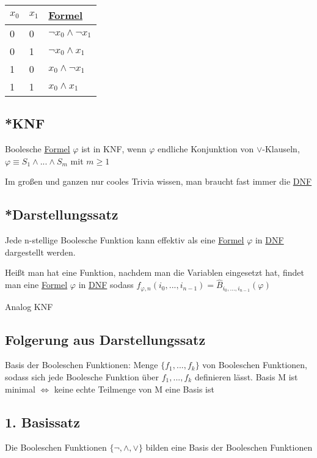 \documentclass[12pt,a4paper]{article} %
\begin{document}
	\begin{tabular}{l | l | l}
		$x_0$ & $x_1$ & \hyperref[Formel]{Formel} \\ \hline
		0 & 0 & $\neg x_0 \land \neg x_1$ \\
		0 & 1 & $\neg x_0 \land x_1$ \\
		1 & 0 & $x_0 \land \neg x_1$ \\
		1 & 1 & $x_0 \land x_1$ \\
	\end{tabular}
	
	\subsection{*KNF}
	Boolesche \hyperref[Formel]{Formel} $\varphi$ ist in KNF, wenn $\varphi$ endliche Konjunktion von $\lor$-Klauseln, $\varphi \equiv S_1 \land ... \land S_m$ mit $m \ge 1$
	
	Im großen und ganzen nur cooles Trivia wissen, man braucht fast immer die \hyperref[DNF]{DNF}
	
	\subsection{*Darstellungssatz}
	Jede n-stellige Boolesche Funktion kann effektiv als eine \hyperref[Formel]{Formel} $\varphi$ in \hyperref[DNF]{DNF} dargestellt werden. 
	
	Heißt man hat eine Funktion, nachdem man die Variablen eingesetzt hat, findet man eine \hyperref[Formel]{Formel} $\varphi$ in \hyperref[DNF]{DNF} sodass $f_{\varphi, n}(i_0, ..., i_{n-1}) = \widehat{B}_{i_0, ..., i_{n - 1}}(\varphi)$
	
	Analog KNF

	\subsection{Folgerung aus Darstellungssatz}
	Basis der Booleschen Funktionen: \newline
	Menge $\{f_1, ..., f_k\}$ von Booleschen Funktionen, sodass sich jede Boolesche Funktion über $
	f_1, ..., f_k$ definieren lässt. \newline
	Basis M ist minimal $\Leftrightarrow$ keine echte Teilmenge von M eine Basis ist
	
	\subsection{1. Basissatz}
	Die Booleschen Funktionen $\{\neg, \land, \lor\}$ bilden eine Basis der Booleschen Funktionen
	
\end{document}
